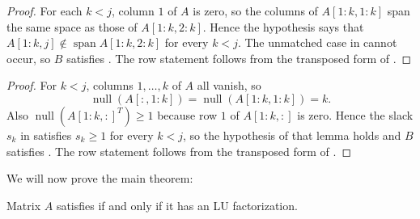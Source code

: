 \documentclass[final]{siamart1116}
\numberwithin{theorem}{section}
\DeclareMathOperator{\nl}{null}
\begin{document}
\begin{proof}
  For each $k < j$, column $1$ of $A$ is zero, so the columns of $A[1:k,1:k]$ span the same space as those of $A[1:k,2:k]$. Hence the hypothesis says that $A[1:k,j] \notin \operatorname{span} A[1:k,2:k]$ for every $k < j$. The unmatched case in  cannot occur, so $B$ satisfies . The row statement follows from the transposed form of .
\end{proof}


\begin{proof}
  For $k < j$, columns $1, \ldots, k$ of $A$ all vanish, so
  \[
    \nl(A[:,1:k]) = \nl(A[1:k,1:k]) = k.
  \]
  Also $\nl({A[1:k,:]}^T) \ge 1$ because row $1$ of $A[1:k,:]$ is zero. Hence the slack $s_k$ in  satisfies $s_k \ge 1$ for every $k < j$, so the hypothesis of that lemma holds and $B$ satisfies .
  The row statement follows from the transposed form of .
\end{proof}

We will now prove the main theorem:
\begin{theorem}\label{thm:main}
  Matrix $A$ satisfies  if and only if it has an LU factorization.
\end{theorem}
\end{document}
